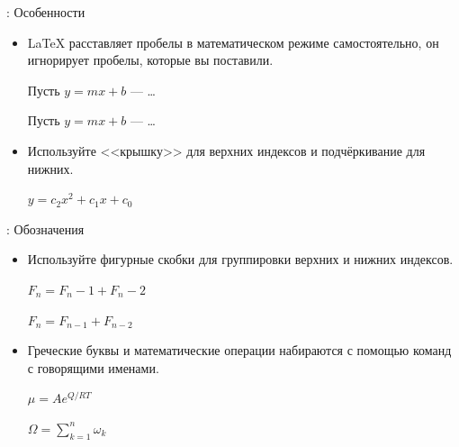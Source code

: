 \documentclass{beamer}
\begin{document}
\begin{frame}[fragile]{\insertsubsection{}: Особенности}
\begin{itemize}
\item \LaTeX{} расставляет пробелы в математическом режиме самостоятельно, он
  игнорирует пробелы, которые вы поставили.

\vspace{2pt}
\begin{exampletwouptiny}
Пусть $y=mx+b$ --- \ldots

Пусть $y = m x + b$ --- \ldots
\end{exampletwouptiny}

\item Используйте <<крышку>>  для верхних индексов и
  подчёркивание \keystrokebftt{\_} для нижних.

\vspace{2pt}
\begin{exampletwouptiny}
$y = c_2 x^2 + c_1 x + c_0$
\end{exampletwouptiny}
\end{itemize}
\end{frame}

\begin{frame}[fragile]{\insertsubsection{}: Обозначения}
\begin{itemize}
\item Используйте фигурные скобки \keystrokebftt{\{} \keystrokebftt{\}} для
группировки верхних и нижних индексов.

\begin{exampletwouptiny}
$F_n = F_n-1 + F_n-2$ %

$F_n = F_{n-1} + F_{n-2}$
\end{exampletwouptiny}

\item Греческие буквы и математические операции набираются с помощью команд
  с говорящими именами.

\begin{exampletwouptiny}
$\mu = A e^{Q/RT}$

$\Omega =
  \sum_{k=1}^{n} \omega_k$
\end{exampletwouptiny}
\end{itemize}
\end{frame}
\end{document}

